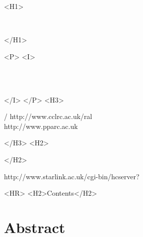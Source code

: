 \begin{htmlonly}
   \xlabel{}
   \begin{rawhtml} <H1> \end{rawhtml}
      \stardoctitle\\
      \stardocmanual
   \begin{rawhtml} </H1> \end{rawhtml}


   \begin{rawhtml} <P> <I> \end{rawhtml}
   \stardoccategory\ \stardocnumber \\
   \stardocauthors \\
   \stardocdate
   \begin{rawhtml} </I> </P> <H3> \end{rawhtml}
       /
                        {http://www.cclrc.ac.uk/ral} \\
                        {http://www.pparc.ac.uk} \\
   \begin{rawhtml} </H3> <H2> \end{rawhtml}
   \begin{rawhtml} </H2> \end{rawhtml}
      {http://www.starlink.ac.uk/cgi-bin/hcserver?\stardocsource}\\

  \label{stardoccontents}
  \begin{rawhtml}
    <HR>
    <H2>Contents</H2>
  \end{rawhtml}
  \newcommand{\latexonlytoc}[0]{}

  \section{Abstract}
\end{htmlonly}

